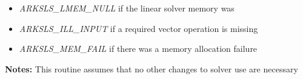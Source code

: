 \documentclass[letterpaper,10pt,english]{sphinxmanual}
\begin{document}
\begin{fulllineitems}
\begin{description}
\begin{itemize}
\item {} 
\emph{ARKSLS\_LMEM\_NULL}  if the linear solver memory was 

\item {} 
\emph{ARKSLS\_ILL\_INPUT} if a required vector operation is missing

\item {} 
\emph{ARKSLS\_MEM\_FAIL} if there was a memory allocation failure

\end{itemize}

\end{description}

\textbf{Notes:}  This routine assumes that no other changes to solver
use are necessary

\end{fulllineitems}

\end{document}
